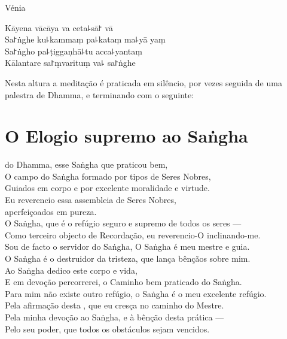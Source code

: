 \enlargethispage{\baselineskip}

\vfill

\begin{instruction}
  Vénia
\end{instruction}

Kāyena vācāya va ceta꜕sā꜓ vā\\
Sa꜓ṅghe ku꜕kammaṃ pa꜕kataṃ ma꜕yā yaṃ\\
Sa꜓ṅgho pa꜕ṭiggaṇhā꜕tu acca꜕yantaṃ\\
Kālantare sa꜓ṃvarituṃ va꜕ sa꜓ṅghe

\vfill

\begin{instruction}
  Nesta altura a meditação é praticada em silêncio, por vezes seguida de uma palestra de Dhamma, e terminando com o seguinte:
\end{instruction}

\clearpage

\nextChapterUseDelegatedPageNumber

\chapter{O Elogio supremo ao Saṅgha}

\begin{leader}
\end{leader}

 do Dhamma, esse Saṅgha que praticou bem,\\
O campo do Saṅgha formado por  tipos de Seres Nobres,\\
Guiados em corpo e  por excelente moralidade e virtude.\\
Eu reverencio essa assembleia de Seres Nobres,\\
\vin aperfeiçoados em pureza.\\
O Saṅgha, que é o refúgio seguro e supremo de todos os seres ---\\
Como terceiro objecto de Recordação, eu reverencio-O inclinando-me.\\
Sou de facto o servidor do Saṅgha, O Saṅgha é meu mestre e guia.\\
O Saṅgha é o destruidor da tristeza, que lança bênçãos sobre mim.\\
Ao Saṅgha dedico este corpo e vida,\\
E em devoção percorrerei, o Caminho bem praticado do Saṅgha.\\
Para mim não existe outro refúgio, o Saṅgha é o meu excelente refúgio.\\
Pela afirmação desta , que eu cresça no caminho do Mestre.\\
Pela minha devoção ao Saṅgha, e à bênção desta prática ---\\
Pelo seu poder, que todos os obstáculos sejam vencidos.

